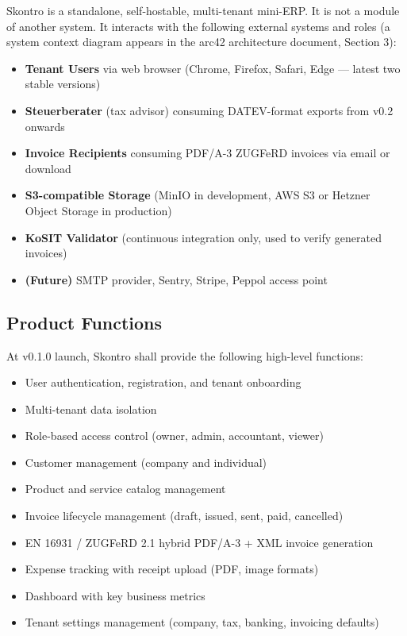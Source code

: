 \documentclass[11pt,a4paper]{article}
\begin{document}
Skontro is a standalone, self-hostable, multi-tenant mini-ERP. It is not a module of another system. It interacts with the following external systems and roles (a system context diagram appears in the arc42 architecture document, Section 3):

\begin{itemize}
    \item \textbf{Tenant Users} via web browser (Chrome, Firefox, Safari, Edge --- latest two stable versions)
    \item \textbf{Steuerberater} (tax advisor) consuming DATEV-format exports from v0.2 onwards
    \item \textbf{Invoice Recipients} consuming PDF/A-3 ZUGFeRD invoices via email or download
    \item \textbf{S3-compatible Storage} (MinIO in development, AWS S3 or Hetzner Object Storage in production)
    \item \textbf{KoSIT Validator} (continuous integration only, used to verify generated invoices)
    \item \textbf{(Future)} SMTP provider, Sentry, Stripe, Peppol access point
\end{itemize}

\subsection{Product Functions}

At v0.1.0 launch, Skontro shall provide the following high-level functions:

\begin{itemize}
    \item User authentication, registration, and tenant onboarding
    \item Multi-tenant data isolation
    \item Role-based access control (owner, admin, accountant, viewer)
    \item Customer management (company and individual)
    \item Product and service catalog management
    \item Invoice lifecycle management (draft, issued, sent, paid, cancelled)
    \item EN 16931 / ZUGFeRD 2.1 hybrid PDF/A-3 + XML invoice generation
    \item Expense tracking with receipt upload (PDF, image formats)
    \item Dashboard with key business metrics
    \item Tenant settings management (company, tax, banking, invoicing defaults)
\end{itemize}
\end{document}
